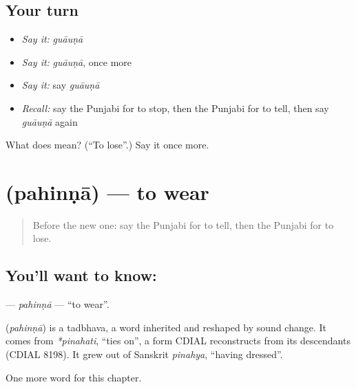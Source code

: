 \subsection*{Your turn}
\begin{itemize}
\raggedright
  \item \emph{Say it:} \emph{guāuṇā}
  \item \emph{Say it:} \emph{guāuṇā}, once more
  \item \emph{Say it:} say \emph{guāuṇā}
  \item \emph{Recall:} say the Punjabi for to stop, then the Punjabi for to tell, then say \emph{guāuṇā} again
\end{itemize}

\begin{tcolorbox}[breakable,colback=teal!4,colframe=teal!35!black,title={Before you move on}]
What does  mean? (\textquotedblleft{}To lose\textquotedblright{}.) Say it once more.
\end{tcolorbox}
\section[\texorpdfstring{\pa{ਪਹਿਨਣਾ} (pahinṇā)}{ਪਹਿਨਣਾ (pahinṇā)}]{ (pahinṇā) — to wear}

\label{lesson:PA-C62-pahinna}



\begin{quote}
Before the new one: say the Punjabi for to tell, then the Punjabi for to lose.
\end{quote}

\subsection*{You'll want to know: }
\textbf{} — \emph{pahinṇā} — \textquotedblleft{}to wear\textquotedblright{}.

\begin{cousinweb}
\textbf{} (\emph{pahinṇā}) is a tadbhava, a word inherited and reshaped by sound change. It comes from \emph{*pinahati}, \textquotedblleft{}ties on\textquotedblright{}, a form CDIAL reconstructs from its descendants (CDIAL 8198). It grew out of Sanskrit \emph{pinahya}, \textquotedblleft{}having dressed\textquotedblright{}.
\end{cousinweb}

\begin{grammarlens}[title={What you've built}]
One more word for this chapter.
\end{grammarlens}


